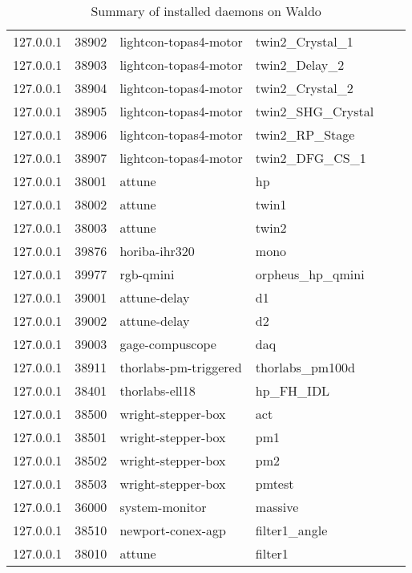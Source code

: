 \begin{table}[]
\begin{tabular}{llllll}
127.0.0.1 & 38902 & lightcon-topas4-motor   & twin2\_Crystal\_1  \\
127.0.0.1 & 38903 & lightcon-topas4-motor   & twin2\_Delay\_2    \\
127.0.0.1 & 38904 & lightcon-topas4-motor   & twin2\_Crystal\_2  \\
127.0.0.1 & 38905 & lightcon-topas4-motor   & twin2\_SHG\_Crystal \\
127.0.0.1 & 38906 & lightcon-topas4-motor   & twin2\_RP\_Stage   \\
127.0.0.1 & 38907 & lightcon-topas4-motor   & twin2\_DFG\_CS\_1  \\
127.0.0.1 & 38001 & attune                  & hp                 \\
127.0.0.1 & 38002 & attune                  & twin1              \\
127.0.0.1 & 38003 & attune                  & twin2              \\
127.0.0.1 & 39876 & horiba-ihr320           & mono               \\
127.0.0.1 & 39977 & rgb-qmini               & orpheus\_hp\_qmini \\
127.0.0.1 & 39001 & attune-delay            & d1                 \\
127.0.0.1 & 39002 & attune-delay            & d2                 \\
127.0.0.1 & 39003 & gage-compuscope         & daq                \\
127.0.0.1 & 38911 & thorlabs-pm-triggered   & thorlabs\_pm100d   \\
127.0.0.1 & 38401 & thorlabs-ell18          & hp\_FH\_IDL        \\
127.0.0.1 & 38500 & wright-stepper-box      & act                \\
127.0.0.1 & 38501 & wright-stepper-box      & pm1                \\
127.0.0.1 & 38502 & wright-stepper-box      & pm2                \\
127.0.0.1 & 38503 & wright-stepper-box      & pmtest             \\
127.0.0.1 & 36000 & system-monitor          & massive            \\
127.0.0.1 & 38510 & newport-conex-agp       & filter1\_angle     \\
127.0.0.1 & 38010 & attune                  & filter1            \\ \hline
\end{tabular}
\caption[Waldo Daemons]{Summary of installed daemons on Waldo}
\label{waldo:tab:summary}
\end{table}


